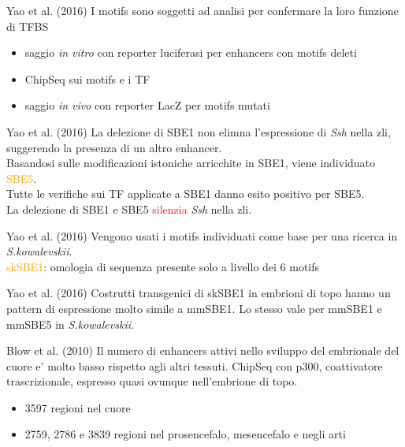 \documentclass{beamer}
\newcommand{\warn}[1]{\textcolor{red}{#1}}
\begin{document}
    \begin{frame}{Yao et al. (2016)}
        I motifs sono soggetti ad analisi per confermare la loro funzione di TFBS
        \begin{itemize}
            \item saggio \emph{in vitro} con reporter luciferasi per enhancers con motifs deleti
            \item ChipSeq sui motifs e i TF
            \item saggio \emph{in vivo} con reporter LacZ per motifs mutati
        \end{itemize}
    \end{frame}


    \begin{frame}{Yao et al. (2016)}
        La delezione di SBE1 non elimna l'espressione di \emph{Ssh} nella zli,
        suggerendo la presenza di un altro enhancer.\\
        Basandosi sulle modificazioni istoniche arricchite in SBE1, viene individuato \textcolor{orange}{SBE5}.\\
        Tutte le verifiche sui TF applicate a SBE1 danno esito positivo per SBE5.\\
        La delezione di SBE1 e SBE5 \warn{silenzia} \emph{Ssh} nella zli.
    \end{frame}


    \begin{frame}{Yao et al. (2016)}
        Vengono usati i motifs individuati come base per una ricerca in \emph{S.kowalevskii}.\\
        \textcolor{orange}{skSBE1}: omologia di sequenza presente solo a livello dei 6 motifs
    \end{frame}


    \begin{frame}{Yao et al. (2016)}
        Costrutti transgenici di skSBE1 in embrioni di topo hanno un pattern di espressione
        molto simile a mmSBE1. Lo stesso vale per mmSBE1 e mmSBE5 in \emph{S.kowalevskii}.
    \end{frame}


    \begin{frame}{Blow et al. (2010)}
        Il numero di enhancers attivi nello sviluppo del embrionale del cuore
        e' molto basso rispetto agli altri tessuti.
        ChipSeq con p300, coattivatore trascrizionale, espresso quasi
        ovunque nell'embrione di topo.
        \begin{itemize}
            \item 3597 regioni nel cuore
            \item 2759, 2786 e 3839 regioni nel prosencefalo,
            mesencefalo e negli arti
        \end{itemize}
    \end{frame}
\end{document}
